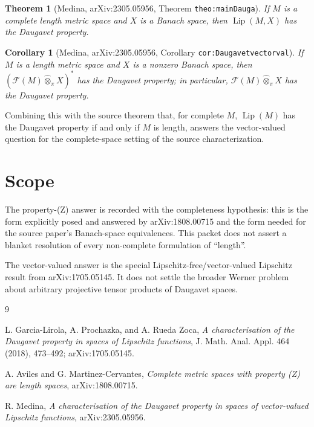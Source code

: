 \documentclass[11pt]{article}
\newcommand{\Lip}{\operatorname{Lip}}
\newcommand{\Free}{\mathcal F}
\newcommand{\pten}{\widehat{\otimes}_{\pi}}
\newtheorem{theorem}{Theorem}
\newtheorem{corollary}{Corollary}
\begin{document}
\begin{theorem}[Medina, arXiv:2305.05956, Theorem \texttt{theo:mainDauga}]
\label{dummy-main}
If \(M\) is a complete length metric space and \(X\) is a Banach space, then
\(\Lip(M,X)\) has the Daugavet property.
\end{theorem}

\begin{corollary}[Medina, arXiv:2305.05956, Corollary \texttt{cor:Daugavetvectorval}]
\label{dummy-cor}
If \(M\) is a length metric space and \(X\) is a nonzero Banach space, then
\((\Free(M)\pten X)^*\) has the Daugavet property; in particular,
\(\Free(M)\pten X\) has the Daugavet property.
\end{corollary}

Combining this with the source theorem that, for complete \(M\),
\(\Lip(M)\) has the Daugavet property if and only if \(M\) is length, answers
the vector-valued question for the complete-space setting of the source
characterization.

\section*{Scope}

The property-(Z) answer is recorded with the completeness hypothesis: this is
the form explicitly posed and answered by arXiv:1808.00715 and the form needed
for the source paper's Banach-space equivalences.  This packet does not assert
a blanket resolution of every non-complete formulation of ``length''.

The vector-valued answer is the special Lipschitz-free/vector-valued
Lipschitz result from arXiv:1705.05145.  It does not settle the broader
Werner problem about arbitrary projective tensor products of Daugavet spaces.

\begin{thebibliography}{9}

L. Garcia-Lirola, A. Prochazka, and A. Rueda Zoca,
\emph{A characterisation of the Daugavet property in spaces of Lipschitz
functions}, J. Math. Anal. Appl. 464 (2018), 473--492; arXiv:1705.05145.

A. Aviles and G. Martinez-Cervantes,
\emph{Complete metric spaces with property (Z) are length spaces},
arXiv:1808.00715.

R. Medina,
\emph{A characterisation of the Daugavet property in spaces of vector-valued
Lipschitz functions}, arXiv:2305.05956.

\end{thebibliography}
\end{document}
